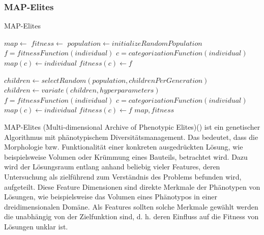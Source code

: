\subsubsection{MAP-Elites}

\label{sub:mapElites}
\begin{algorithm}
	\caption{MAP-Elites} \label{alg:mapElites}
	\begin{algorithmic}[1]
		\State $map \gets $ 
		\State $fitness \gets $ 
		\State $population \gets initializeRandomPopulation$ 
			\State $f = fitnessFunction(individual)$
			\State $c = categorizationFunction(individual)$ 
			 
				\State $map(c) \gets individual$
				\State $fitness(c) \gets f$
			\EndIf
		\EndFor
		
			\State $children \gets selectRandom(population,childrenPerGeneration)$ 
			\State $children \gets variate(children,hyperparameters)$ 
				\State $f = fitnessFunction(individual)$
				\State $c = categorizationFunction(individual)$
					\State $map(c) \gets individual$
					\State $fitness(c) \gets f$
				\EndIf
			\EndFor
		\EndFor
		\Return $map,fitness$
		\EndProcedure
	\end{algorithmic}
\end{algorithm}
MAP-Elites (Multi-dimensional Archive of Phenotypic Elites)(\cite{Mouret.4202015}) ist ein genetischer Algorithmus mit phänotypischem Diversitätsmanagement.
Das bedeutet, dass die Morphologie bzw. Funktionalität einer konkreten ausgedrückten Lösung, wie beispielsweise Volumen oder Krümmung eines Bauteils, betrachtet wird.
Dazu wird der Lösungsraum entlang anhand beliebig vieler Features, deren Untersuchung als zielführend zum Verständnis des Problems befunden wird, aufgeteilt.
Diese Feature Dimensionen sind direkte Merkmale der Phänotypen von Lösungen, wie beispielsweise das Volumen eines Phänotypos in einer dreidimensionalen Domäne.
Als Features sollten solche Merkmale gewählt werden die unabhängig von der Zielfunktion sind, d. h. deren Einfluss auf die Fitness von Lösungen unklar ist.
